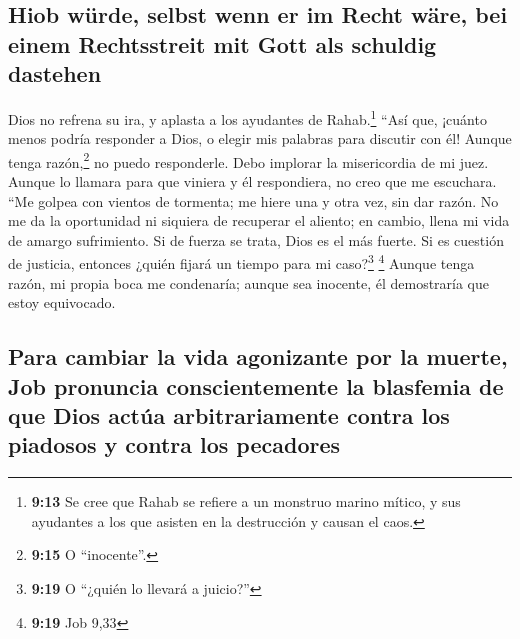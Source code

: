 \hypertarget{hiob-wuxfcrde-selbst-wenn-er-im-recht-wuxe4re-bei-einem-rechtsstreit-mit-gott-als-schuldig-dastehen}{%
\subsection{Hiob würde, selbst wenn er im Recht wäre, bei einem
Rechtsstreit mit Gott als schuldig
dastehen}\label{hiob-wuxfcrde-selbst-wenn-er-im-recht-wuxe4re-bei-einem-rechtsstreit-mit-gott-als-schuldig-dastehen}}

 Dios no refrena su ira, y aplasta a los ayudantes de
Rahab.\footnote{\textbf{9:13} Se cree que Rahab se refiere a un monstruo
  marino mítico, y sus ayudantes a los que asisten en la destrucción y
  causan el caos.}  ``Así que, ¡cuánto menos podría
responder a Dios, o elegir mis palabras para discutir con él!
 Aunque tenga razón,\footnote{\textbf{9:15} O
  ``inocente''.} no puedo responderle. Debo implorar la misericordia de
mi juez.  Aunque lo llamara para que viniera y él
respondiera, no creo que me escuchara.  ``Me golpea con
vientos de tormenta; me hiere una y otra vez, sin dar razón.
 No me da la oportunidad ni siquiera de recuperar el
aliento; en cambio, llena mi vida de amargo sufrimiento. 
Si de fuerza se trata, Dios es el más fuerte. Si es cuestión de
justicia, entonces ¿quién fijará un tiempo para mi caso?\footnote{\textbf{9:19}
  O ``¿quién lo llevará a juicio?''} \footnote{\textbf{9:19} Job 9,33}
 Aunque tenga razón, mi propia boca me condenaría; aunque
sea inocente, él demostraría que estoy equivocado.

\hypertarget{para-cambiar-la-vida-agonizante-por-la-muerte-job-pronuncia-conscientemente-la-blasfemia-de-que-dios-actuxfaa-arbitrariamente-contra-los-piadosos-y-contra-los-pecadores}{%
\subsection{Para cambiar la vida agonizante por la muerte, Job pronuncia
conscientemente la blasfemia de que Dios actúa arbitrariamente contra
los piadosos y contra los
pecadores}\label{para-cambiar-la-vida-agonizante-por-la-muerte-job-pronuncia-conscientemente-la-blasfemia-de-que-dios-actuxfaa-arbitrariamente-contra-los-piadosos-y-contra-los-pecadores}}

